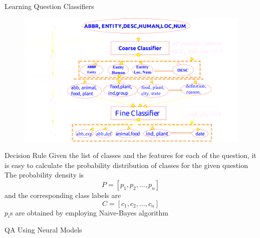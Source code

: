 \begin{frame}{Learning Question Classifiers}
    \begin{center}
        \begin{figure}
            \includegraphics[width=0.85\linewidth]{"./Images/Learning Question Classifiers"}
        \end{figure}

    \end{center}

\end{frame}

\begin{frame}{Decision Rule}
Given the list of classes and the features for each of the question, it is easy to calculate the probability distribution of classes for the given question\cite{li-roth-2002-learning}\\
The probability density is
\begin{equation}
P = [p_1,p_2,\ldots, p_n]
\end{equation} and the corresponding class labels are \begin{equation}
C= [c_1,c_2,\ldots,c_n]
\end{equation}
$p_i$s are obtained by employing Naive-Bayes algorithm
\end{frame}

\begin{frame}
    \centering
    \Huge{QA Using Neural Models}
\end{frame}

